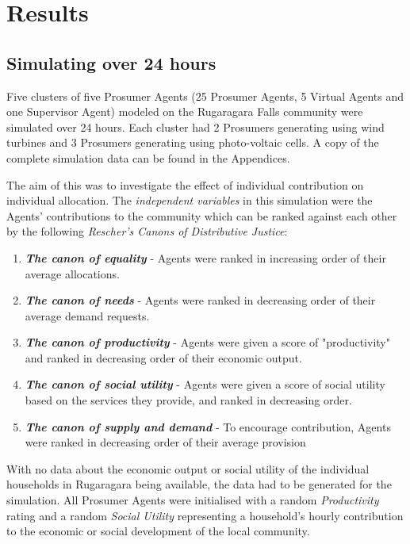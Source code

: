 \chapter{Results}
\label{Results}

\section*{Simulating over 24 hours}
Five clusters of five Prosumer Agents (25 Prosumer Agents, 5 Virtual Agents and one Supervisor Agent) modeled on the Rugaragara Falls community were simulated over 24 hours. Each cluster had 2 Prosumers generating using wind turbines and 3 Prosumers generating using photo-voltaic cells. A copy of the complete simulation data can be found in the Appendices.

The aim of this was to investigate the effect of individual contribution on individual allocation. The \textit{independent variables} in this simulation were the Agents' contributions to the community which can be ranked against each other by the following \textit{Rescher's Canons of Distributive Justice}:
\begin{enumerate}
	\item \textbf{\textit{The canon of equality}} - Agents were ranked in increasing order of their average allocations.
	\item \textbf{\textit{The canon of needs}} - Agents were ranked in decreasing order of their average demand requests.
	\item \textbf{\textit{The canon of productivity}} - Agents were given a score of "productivity" and ranked in decreasing order of their economic output.
	\item \textbf{\textit{The canon of social utility}} - Agents were given a score of social utility based on the services they provide, and ranked in decreasing order.
	\item \textbf{\textit{The canon of supply and demand}} - To encourage contribution, Agents were ranked in decreasing order of their average provision
\end{enumerate}

With no data about the economic output or social utility of the individual households in Rugaragara being available, the data had to be generated for the simulation. All Prosumer Agents were initialised with a random \textit{Productivity} rating and a random \textit{Social Utility} representing a household's hourly contribution to the economic or social development of the local community.

